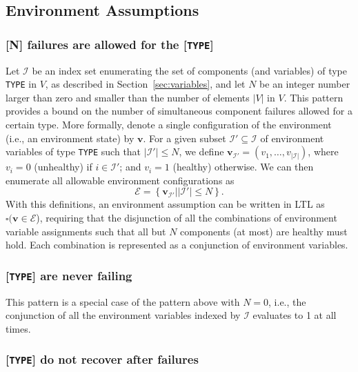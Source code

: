 \documentclass[journal]{IEEEtran}
\newcommand{\pfr}[1]{\mathcal{#1}}
\begin{document}
\subsection{Environment Assumptions} \label{formalspecsA}

 \subsubsection{[N] failures are allowed for the [\texttt{TYPE}]}

 Let $\mathcal{I}$ be an index set enumerating the set of components (and variables) of type \texttt{TYPE} in $V$, as  described in Section~\ref{sec:variables}, and let $N$ be an integer number larger than zero and smaller than the number of elements $|V|$  in $V$. This pattern provides a
 bound on the number of simultaneous component failures allowed for a certain type. More
 formally, denote a single configuration of the environment (i.e., an
 environment state) by $\mathbf{v}$. For a given subset $\mathcal{I}'\subseteq
 \mathcal{I}$ of environment variables of type \texttt{TYPE} such that $|\mathcal{I}'| \leq N$, we define $\mathbf{v}_{\mathcal{I}'}
 = (v_1, \ldots, v_{|\mathcal{I}|})$, where $v_i=0$ (unhealthy) if
 $i\in\mathcal{I}'$; and $v_i=1$ (healthy) otherwise. We can then enumerate all
allowable environment configurations as
\begin{equation}\label{eq:relassumption}
\mathcal{E} = \left\{ \mathbf{v}_{\mathcal{I}'} | |\mathcal{I}'| \leq N \right\}.
 \end{equation}
With this definitions, an environment assumption can be written in LTL
as $\square (\mathbf{v}\in \mathcal{E}$), requiring that the 
disjunction of all the combinations of environment variable assignments such that all but $N$ components (at most) are healthy must hold. Each combination is represented as a conjunction of environment variables. 

\subsubsection{[\texttt{TYPE}] are never failing}

This pattern is a special case of the pattern above with $N=0$, i.e., the conjunction of all the environment variables indexed by $\pfr{I}$ evaluates to 1 at all times. 

\subsubsection{[\texttt{TYPE}] do not recover after failures}
\end{document}
